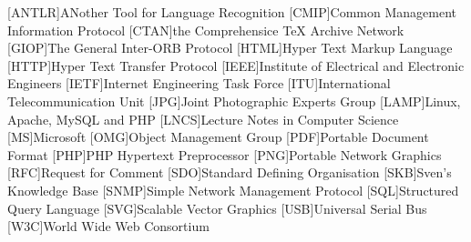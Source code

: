 \begin{acronym}[TM Forum]
\setlength{\itemsep}{0pt}\setlength{\parskip}{0pt}
  [ANTLR]{ANother Tool for Language Recognition}
  [CMIP]{Common Management Information Protocol}
  [CTAN]{the Comprehensice TeX Archive Network}
  [GIOP]{The General Inter-ORB Protocol}
  [HTML]{Hyper Text Markup Language}
  [HTTP]{Hyper Text Transfer Protocol}
  [IEEE]{Institute of Electrical and Electronic Engineers}
  [IETF]{Internet Engineering Task Force}
  [ITU]{International Telecommunication Unit}
  [JPG]{Joint Photographic Experts Group}
  [LAMP]{Linux, Apache, MySQL and PHP}
  [LNCS]{Lecture Notes in Computer Science}
  [MS]{Microsoft}
  [OMG]{Object Management Group}
  [PDF]{Portable Document Format}
  [PHP]{PHP Hypertext Preprocessor}
  [PNG]{Portable Network Graphics}
  [RFC]{Request for Comment}
  [SDO]{Standard Defining Organisation}
  [SKB]{Sven's Knowledge Base}
  [SNMP]{Simple Network Management Protocol}
  [SQL]{Structured Query Language}
  [SVG]{Scalable Vector Graphics}
  [USB]{Universal Serial Bus}
  [W3C]{World Wide Web Consortium}
\end{acronym}